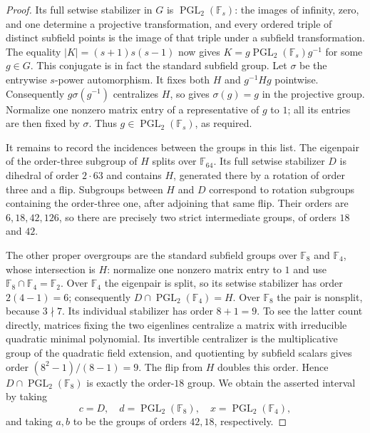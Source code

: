 \begin{proof}
Its full setwise stabilizer in $G$ is $\operatorname{PGL}_2(\mathbb F_s)$:
the images of infinity, zero, and one determine a projective transformation,
and every ordered triple of distinct subfield points is the image of that
triple under a subfield transformation. The equality
$|K|=(s+1)s(s-1)$ now gives
$K=g\operatorname{PGL}_2(\mathbb F_s)g^{-1}$ for some $g\in G$.
This conjugate is in fact the standard subfield group. Let $\sigma$ be the
entrywise $s$-power automorphism. It fixes both $H$ and $g^{-1}Hg$ pointwise.
Consequently $g\sigma(g^{-1})$ centralizes $H$, so
 gives $\sigma(g)=g$ in the projective group.
Normalize one nonzero matrix entry of a representative of $g$ to $1$;
all its entries are then fixed by $\sigma$. Thus
$g\in\operatorname{PGL}_2(\mathbb F_s)$, as required.

It remains to record the incidences between the groups in this list. The
eigenpair of the order-three subgroup of $H$ splits over $\mathbb F_{64}$.
Its full setwise stabilizer $D$ is dihedral of order $2\cdot63$ and contains
$H$, generated there by a rotation of order three and a flip. Subgroups
between $H$ and $D$ correspond to rotation subgroups containing the
order-three one, after adjoining that same flip. Their orders are
$6,18,42,126$, so there are precisely two strict intermediate groups, of
orders $18$ and $42$.

The other proper overgroups are the standard subfield groups over
$\mathbb F_8$ and $\mathbb F_4$, whose intersection is $H$: normalize one nonzero matrix entry to $1$
and use $\mathbb F_8\cap\mathbb F_4=\mathbb F_2$. Over
$\mathbb F_4$ the eigenpair is split, so its setwise stabilizer has order
$2(4-1)=6$; consequently
$D\cap\operatorname{PGL}_2(\mathbb F_4)=H$. Over $\mathbb F_8$ the pair is
nonsplit, because $3\nmid7$. Its individual stabilizer has order $8+1=9$.
To see the latter count directly, matrices fixing the two eigenlines
centralize a matrix with irreducible quadratic minimal polynomial. Its
invertible centralizer is the multiplicative group of the quadratic field
extension, and quotienting by subfield scalars gives order
$(8^2-1)/(8-1)=9$. The flip from $H$ doubles this order. Hence
$D\cap\operatorname{PGL}_2(\mathbb F_8)$ is exactly the order-$18$ group.
We obtain the asserted interval by taking
\[
 c=D,\quad d=\operatorname{PGL}_2(\mathbb F_8),\quad
 x=\operatorname{PGL}_2(\mathbb F_4),
\]
and taking $a,b$ to be the groups of orders $42,18$, respectively.
\end{proof}

